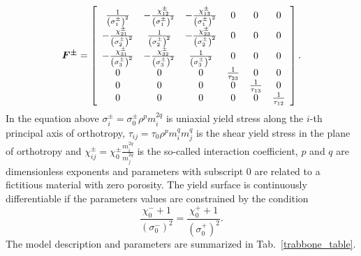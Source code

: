 \documentclass[a4paper]{article}
\newcommand{\mbf}[1]{\mbox{\boldmath$#1$}}
\begin{document}
\begin{equation}
  \mbf{F^{\pm}}=\left[\begin{array}{cccccc}
\frac{1}{\left({\sigma_{1}^{\pm}}\right)^2} & -\frac{\chi_{12}^{\pm}}{\left({\sigma_{1}^{\pm}}\right)^2}&-\frac{\chi_{13}^{\pm}}{\left({\sigma_{1}^{\pm}}\right)^2}& 0& 0&0\\
-\frac{\chi_{21}^{\pm}}{\left({\sigma_{2}^{\pm}}\right)^2} & \frac{1}{\left({\sigma_{2}^{\pm}}\right)^2}&-\frac{\chi_{23}^{\pm}}{\left({\sigma_{2}^{\pm}}\right)^2}& 0& 0&0\\
-\frac{\chi_{31}^{\pm}}{\left({\sigma_{3}^{\pm}}\right)^2} & -\frac{\chi_{32}^{\pm}}{\left({\sigma_{3}^{\pm}}\right)^2}&\frac{1}{\left({\sigma_{3}^{\pm}}\right)^2}& 0& 0&0\\
0 & 0 & 0 & \frac{1}{\tau_{23}} & 0 & 0\\
0 & 0 & 0 & 0 & \frac{1}{\tau_{13}} & 0\\
0 & 0 & 0 & 0 & 0 & \frac{1}{\tau_{12}}
 \end{array}\right].
\end{equation}
In the equation above $\sigma_i^{\pm} = \sigma_0^{\pm}\rho^p m_i^{2q}$ is uniaxial yield stress along the $i$-th principal axis of orthotropy, $\tau_{ij} = \tau_0 \rho^p m_i^q m_j^q$ is the shear yield stress in the plane of orthotropy and $\chi_{ij}^{\pm} = \chi_0^{\pm}\frac{m_i^{2q}}{m_j^{2q}}$ is the so-called interaction coefficient, $p$ and $q$ are dimensionless exponents and parameters with subscript $0$ are related to a fictitious material with zero porosity. The yield surface is continuously differentiable if the parameters values are constrained by the condition
\begin{equation}
\frac{\chi_0^- +1}{(\sigma_0^-)^2} = \frac{\chi_0^+ +1}{(\sigma_0^+)^2}.
\end{equation}
The model description and parameters are summarized in Tab.~\ref{trabbone_table}.
\end{document}
